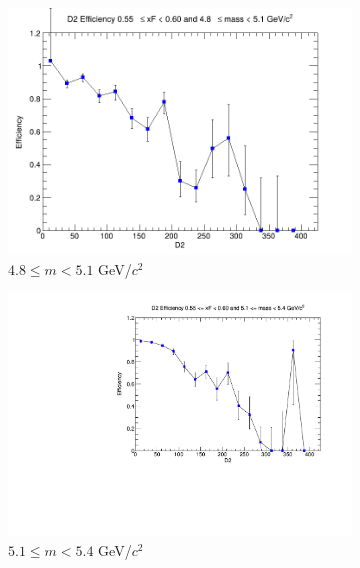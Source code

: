 \documentclass[11pt]{article}
\begin{document}
\begin{figure}[p]
\begin{subfigure}[b]{0.32\textwidth}
        \includegraphics[width=\textwidth]{./kTrackerEfficiencyPlots/D2_Efficiency_xF11_mass2.png}
        \caption{$4.8 \leq m < 5.1$ GeV/$c^2$}
    \end{subfigure}\vspace{0.5cm}
    \begin{subfigure}[b]{0.32\textwidth}
        \centering
        \includegraphics[width=\textwidth]{./kTrackerEfficiencyPlots/D2_Efficiency_xF11_mass3.pdf}
        \caption{$5.1 \leq m < 5.4$ GeV/$c^2$}
    \end{subfigure}\hfill
    \begin{subfigure}[b]{0.32\textwidth}
        \centering

\end{subfigure}
\end{figure}
\end{document}
